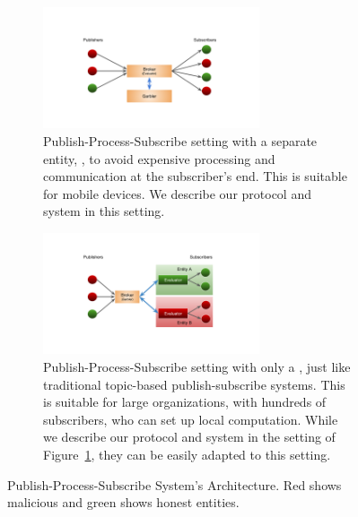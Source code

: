 \begin{figure}[h]
	\centering
	
		\begin{subfigure}{0.45\textwidth}
		\centering
		\includegraphics[width=0.7\textwidth]{figures/pps-out}

		\caption{Publish-Process-Subscribe setting with a separate entity,
		\garbler, to avoid expensive processing and communication at the
		subscriber's end. This is suitable for mobile devices. We describe our
			protocol and system in this setting. 
		}

		\vspace{12pt}
		\label{fig:pps-out}
	\end{subfigure}
	
	\begin{subfigure}{0.45\textwidth}
		\centering
		\includegraphics[width=0.7\textwidth]{figures/pps-local}

		\caption{Publish-Process-Subscribe setting with only a \broker, just like
		traditional topic-based publish-subscribe systems. This is suitable for
		large organizations, with hundreds of subscribers, who can set up local
		computation. While we describe our protocol and system in the setting of
		Figure~\ref{fig:pps-out}, they can be easily adapted to this setting.}

		\label{fig:pps-local}
	\end{subfigure}


	\vspace{12pt}
	\caption{Publish-Process-Subscribe System's Architecture. {\color{red}Red} shows {\color{red}malicious} and {\color{green} green} shows {\color{green} honest} entities.
			}
	\label{fig:pps}
\end{figure}


